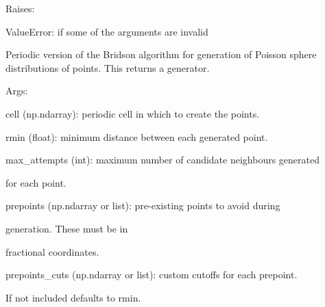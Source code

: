 \documentclass[letterpaper,10pt,english]{sphinxmanual}
\begin{document}
\begin{fulllineitems}
\begin{DUlineblock}{0em}
\item[] Raises:
\item[]
\begin{DUlineblock}{\DUlineblockindent}
\item[] ValueError: if some of the arguments are invalid
\end{DUlineblock}
\end{DUlineblock}

\end{fulllineitems}


\begin{fulllineitems}
\label{doctree/soprano.utils:soprano.utils.periodic_bridson}
Periodic version of the Bridson algorithm for generation of Poisson
sphere distributions of points. This returns a generator.

\begin{DUlineblock}{0em}
\item[] Args:
\item[]
\begin{DUlineblock}{\DUlineblockindent}
\item[] cell (np.ndarray): periodic cell in which to create the points.
\item[] rmin (float): minimum distance between each generated point.
\item[] max\_attempts (int): maximum number of candidate neighbours generated
\item[]
\begin{DUlineblock}{\DUlineblockindent}
\item[] for each point.
\end{DUlineblock}
\item[] prepoints (np.ndarray or list): pre-existing points to avoid during
\item[]
\begin{DUlineblock}{\DUlineblockindent}
\item[] generation. These must be in
\item[] fractional coordinates.
\end{DUlineblock}
\item[] prepoints\_cuts (np.ndarray or list): custom cutoffs for each prepoint.
\item[]
\begin{DUlineblock}{\DUlineblockindent}
\item[] If not included defaults to rmin.
\end{DUlineblock}
\end{DUlineblock}
\end{DUlineblock}


\end{fulllineitems}
\end{document}
